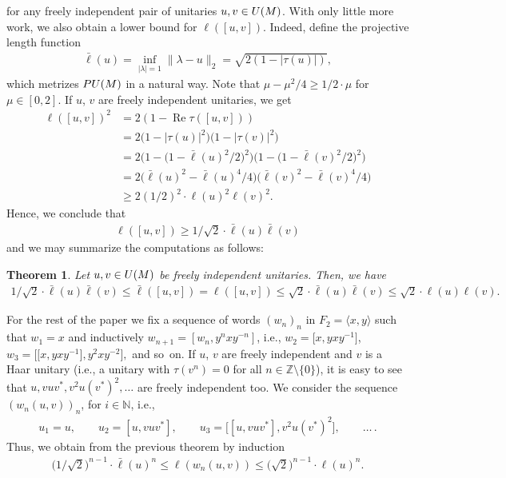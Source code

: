 \documentclass[11pt]{article}
\numberwithin{equation}{section}
\numberwithin{equation}{section}
\newtheorem{Theorem}{Theorem}[section]
\begin{document}
for any freely independent pair of unitaries $u,v \in {\rm U}(M)$. With only little more work, we also obtain a lower bound for $\ell([u,v])$.
Indeed, define the projective length function
\begin{gather*}
\bar \ell(u) = \inf_{|\lambda|=1 } \|\lambda - u\|_2 = \sqrt{2(1-|\tau(u)|)},
\end{gather*}
which metrizes ${\rm PU}(M)$ in a natural way. Note that
$\mu - \mu^2/4 \geq 1/2 \cdot \mu$ for $\mu \in [0,2]$. If $u$, $v$ are freely independent unitaries, we get
\begin{align*}
\ell([u,v])^2 &= 2(1 - \operatorname{Re} \tau([u,v])) \\
&= 2 \big(1-|\tau(u)|^2\big)\big(1- |\tau(v)|^2\big) \\
&= 2 \big(1-\big(1-\bar\ell(u)^2/2\big)^2\big) \big(1-\big(1-\bar\ell(v)^2/2\big)^2\big) \\
&= 2 \big( \bar \ell(u)^2 - \bar \ell(u)^4/4\big) \big( \bar \ell(v)^2 - \bar \ell(v)^4/4\big) \\
&\geq 2 (1/2)^2 \cdot \ell(u)^2 \ell(v)^2.
\end{align*}
Hence, we conclude that
\begin{gather*}
\ell([u,v]) \geq 1/\sqrt{2} \cdot \bar \ell(u) \bar \ell(v)
\end{gather*}
and we may summarize the computations as follows:
\begin{Theorem}
Let $u,v \in {\rm U}(M)$ be freely independent unitaries. Then, we have
\begin{gather*}
1/\sqrt{2} \cdot \bar \ell(u) \bar \ell(v) \leq \bar\ell([u,v])= \ell([u,v]) \leq \sqrt{2} \cdot \bar \ell(u) \bar \ell(v) \leq \sqrt{2} \cdot \ell(u) \ell(v).
\end{gather*}
\end{Theorem}

For the rest of the paper we fix a sequence of words $(w_n)_n$ in $F_2= \langle x,y \rangle$ such that $w_1=x$ and inductively $w_{n+1} = [w_n,y^{n}xy^{-n}]$, i.e., $w_2=\big[x,yxy^{-1}\big]$, $w_3=\big[\big[x,yxy^{-1}\big],y^2xy^{-2}\big],$ and so~on. If $u$, $v$ are freely independent and $v$ is a Haar unitary (i.e., a unitary with $\tau(v^n)=0$ for all $n \in \mathbb Z \setminus \{0\}$), it is easy to see that $ u,vuv^*,v^2u(v^*)^2,\dots$ are freely independent too. We consider the sequence $(w_n(u,v))_n$, for $i \in \mathbb N$, i.e.,
\begin{gather*}
u_1=u, \qquad
u_2=[u,vuv^*], \qquad
u_3=\big[[u,vuv^*],v^2u(v^*)^2 \big],\qquad \dots\,.
\end{gather*}
Thus, we obtain from the previous theorem by induction
\begin{gather*}
\big(1/\sqrt{2}\big)^{n-1} \cdot \bar\ell(u)^n \leq \ell(w_n(u,v)) \leq \big(\sqrt{2}\big)^{n-1} \cdot \ell(u)^n.
\end{gather*}
\end{document}

